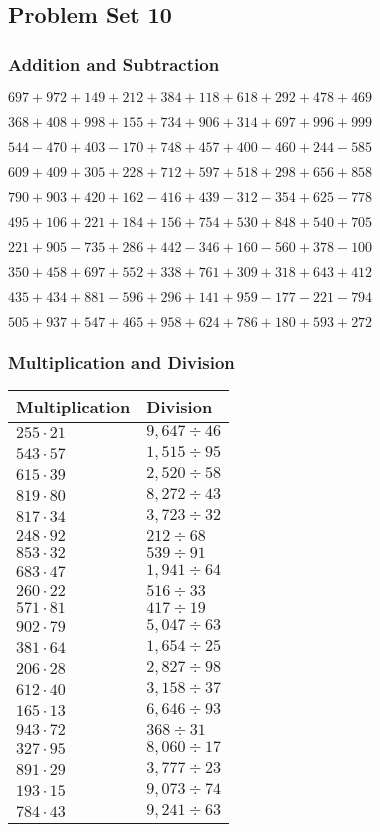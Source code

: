 \hypertarget{problem-set-10-2}{%
\subsection{Problem Set 10}\label{problem-set-10-2}}

\hypertarget{addition-and-subtraction-110}{%
\subsubsection{Addition and
Subtraction}\label{addition-and-subtraction-110}}

\(697 + 972 + 149 + 212 + 384 + 118 + 618 + 292 + 478 + 469\)

\(368 + 408 + 998 + 155 + 734 + 906 + 314 + 697 + 996 + 999\)

\(544 - 470 + 403 - 170 + 748 + 457 + 400 - 460 + 244 - 585\)

\(609 + 409 + 305 + 228 + 712 + 597 + 518 + 298 + 656 + 858\)

\(790 + 903 + 420 + 162 - 416 + 439 - 312 - 354 + 625 - 778\)

\(495 + 106 + 221 + 184 + 156 + 754 + 530 + 848 + 540 + 705\)

\(221 + 905 - 735 + 286 + 442 - 346 + 160 - 560 + 378 - 100\)

\(350 + 458 + 697 + 552 + 338 + 761 + 309 + 318 + 643 + 412\)

\(435 + 434 + 881 - 596 + 296 + 141 + 959 - 177 - 221 - 794\)

\(505 + 937 + 547 + 465 + 958 + 624 + 786 + 180 + 593 + 272\)

\hypertarget{multiplication-and-division-110}{%
\subsubsection{Multiplication and
Division}\label{multiplication-and-division-110}}

\begin{longtable}[]{@{}ll@{}}
\toprule
Multiplication & Division\tabularnewline
\midrule
\endhead
\(255 \cdot 21\) & \(9,647÷46\)\tabularnewline
\(543 \cdot 57\) & \(1,515÷95\)\tabularnewline
\(615 \cdot 39\) & \(2,520÷58\)\tabularnewline
\(819 \cdot 80\) & \(8,272÷43\)\tabularnewline
\(817 \cdot 34\) & \(3,723÷32\)\tabularnewline
\(248 \cdot 92\) & \(212÷68\)\tabularnewline
\(853 \cdot 32\) & \(539÷91\)\tabularnewline
\(683 \cdot 47\) & \(1,941÷64\)\tabularnewline
\(260 \cdot 22\) & \(516÷33\)\tabularnewline
\(571 \cdot 81\) & \(417÷19\)\tabularnewline
\(902 \cdot 79\) & \(5,047÷63\)\tabularnewline
\(381 \cdot 64\) & \(1,654÷25\)\tabularnewline
\(206 \cdot 28\) & \(2,827÷98\)\tabularnewline
\(612 \cdot 40\) & \(3,158÷37\)\tabularnewline
\(165 \cdot 13\) & \(6,646÷93\)\tabularnewline
\(943 \cdot 72\) & \(368÷31\)\tabularnewline
\(327 \cdot 95\) & \(8,060÷17\)\tabularnewline
\(891 \cdot 29\) & \(3,777÷23\)\tabularnewline
\(193 \cdot 15\) & \(9,073÷74\)\tabularnewline
\(784 \cdot 43\) & \(9,241÷63\)\tabularnewline
\bottomrule
\end{longtable}

